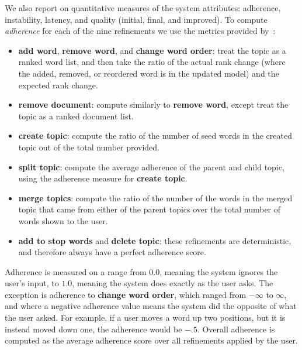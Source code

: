 We also report on quantitative measures of the system attributes: adherence, instability, latency, and quality (initial, final, and improved). 
To compute \textit{adherence} for each of the nine refinements we use the metrics provided by~:
\begin{itemize}
    \item \textbf{add word}, \textbf{remove word}, and \textbf{change word order}: treat the topic as a ranked word list, and then take the ratio of the actual rank change (where the added, removed, or reordered word is in the updated model) and the expected rank change.
    \item \textbf{remove document}: compute similarly to \textbf{remove word}, except treat the topic as a ranked document list.
    \item \textbf{create topic}: compute the ratio of the number of seed words in the created topic out of the total number provided.
    \item \textbf{split topic}: compute the average adherence of the parent and child topic, using the adherence measure for \textbf{create topic}.
    \item \textbf{merge topics}: compute the ratio of the number of the words in the merged topic that came from either of the parent topics over the total number of words shown to the user.
    \item \textbf{add to stop words} and \textbf{delete topic}: these refinements are deterministic, and therefore always have a perfect adherence score.
\end{itemize}
Adherence is measured on a range from $0.0$, meaning the system ignores the user's input, to
$1.0$, meaning the system does exactly as the user asks.
  The exception is adherence to
\textbf{change word order}, which ranged from $-\infty$ to $\infty$, and where a
negative adherence value means the system did the opposite of what the
user asked. For example, if a user moves a word up two positions, but it is instead moved down one, the adherence would be $-.5$. 
Overall adherence is computed as the average adherence score over all refinements applied by the user.


